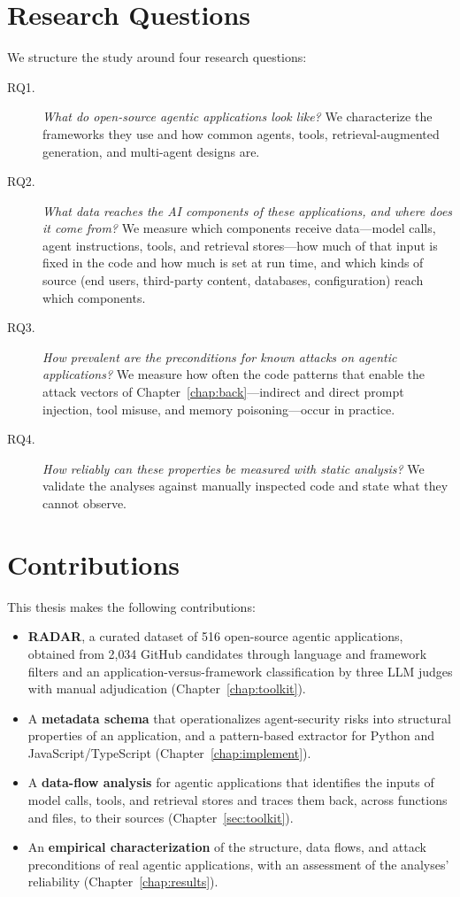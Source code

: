 \section*{Research Questions}

We structure the study around four research questions:

\begin{description}
  \item[RQ1.] \emph{What do open-source agentic applications look like?} We characterize the frameworks they use and how common agents, tools, retrieval-augmented generation, and multi-agent designs are.
  \item[RQ2.] \emph{What data reaches the AI components of these applications, and where does it come from?} We measure which components receive data---model calls, agent instructions, tools, and retrieval stores---how much of that input is fixed in the code and how much is set at run time, and which kinds of source (end users, third-party content, databases, configuration) reach which components.
  \item[RQ3.] \emph{How prevalent are the preconditions for known attacks on agentic applications?} We measure how often the code patterns that enable the attack vectors of Chapter~\ref{chap:back}---indirect and direct prompt injection, tool misuse, and memory poisoning---occur in practice.
  \item[RQ4.] \emph{How reliably can these properties be measured with static analysis?} We validate the analyses against manually inspected code and state what they cannot observe.
\end{description}

\section*{Contributions}

This thesis makes the following contributions:
\begin{itemize}
  \item \textbf{RADAR}, a curated dataset of 516 open-source agentic applications, obtained from 2{,}034 GitHub candidates through language and framework filters and an application-versus-framework classification by three LLM judges with manual adjudication (Chapter~\ref{chap:toolkit}).
  \item A \textbf{metadata schema} that operationalizes agent-security risks into structural properties of an application, and a pattern-based extractor for Python and JavaScript/TypeScript (Chapter~\ref{chap:implement}).
  \item A \textbf{data-flow analysis} for agentic applications that identifies the inputs of model calls, tools, and retrieval stores and traces them back, across functions and files, to their sources (Chapter~\ref{sec:toolkit}).
  \item An \textbf{empirical characterization} of the structure, data flows, and attack preconditions of real agentic applications, with an assessment of the analyses' reliability (Chapter~\ref{chap:results}).
\end{itemize}

